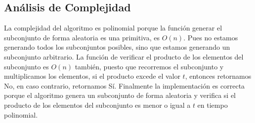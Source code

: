 \documentclass{article}
\begin{document}
\subsection{Análisis de Complejidad}

La complejidad del algoritmo es polinomial porque la función generar el subconjunto 
de forma aleatoria es una primitiva, es $O(n)$. Pues no estamos generando
todos los subconjuntos posibles, sino que estamos generando un subconjunto arbitrario.
La función de verificar el producto de los elementos del subconjunto es $O(n)$ también, puesto que
recorremos el subconjunto y multiplicamos los elementos, si el producto excede el valor $t$, 
entonces retornamos No, en caso contrario, retornamos Sí. 
Finalmente la implementación es correcta porque el algoritmo genera un subconjunto de forma aleatoria
y verifica si el producto de los elementos del subconjunto es menor o igual a $t$ en tiempo polinomial.
\end{document}
